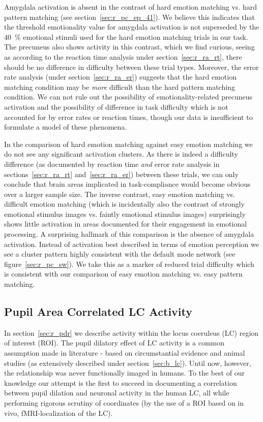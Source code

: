 	    Amygdala activation is absent in the contrast of hard emotion matching vs. hard pattern matching (see section~\ref{sec:r_pc_ep_41}).
	    We believe this indicates that the threshold emotionality value for amygdala activation is not superseded by the \SI{40}{\percent} emotional stimuli used for the hard emotion matching trials in our task.
	    The precuneus also shows activity in this contrast, which we find curious, seeing as according to the reaction time analysis under section~\ref{sec:r_ra_rt}, there should be no difference in difficulty between these trial types.
	    Moreover, the error rate analysis (under section~\ref{sec:r_ra_er}) suggests that the hard emotion matching condition may be \textit{more} difficult than the hard pattern matching condition.
	    We can not rule out the possibility of emotionality-related precuneus activation and the possibility of difference in task difficulty which is not accounted for by error rates or reaction times, though our data is insufficient to formulate a model of these phenomena.
	    
	    In the comparison of hard emotion matching against easy emotion matching we do not see any significant activation clusters.
	    As there is indeed a difficulty difference (as documented by reaction time \textit{and} error rate analysis in sections~\ref{sec:r_ra_rt} and~\ref{sec:r_ra_er}) between these trials, we can only conclude that brain areas implicated in task-compliance would become obvious over a larger sample size.
	    The inverse contrast, easy emotion matching vs. difficult emotion matching (which is incidentally also the contrast of strongly emotional stimulus images vs. faintly emotional stimulus images) surprisingly shows little activation in areas documented for their engagement in emotional processing.
	    A surprising hallmark of this comparison is the absence of amygdala activation.
	    Instead of activation best described in terms of emotion perception we see a cluster pattern highly consistent with the default mode network (see figure~\ref{sec:r_pc_sw}).
	    We take this as a marker of reduced trial difficulty which is consistent with our comparison of easy emotion matching vs. easy pattern matching. 
	\subsection{Pupil Area Correlated LC Activity}
	    In section~\ref{sec:r_pdr} we describe activity within the locus coeruleus (LC) region of interest (ROI).
	    The pupil dilatory effect of LC activity is a common assumption made in literature - based on circumstantial evidence and animal studies (as extensively described under section~\ref{sec:b_lc}).
	    Until now, however, the relationship was never functionally imaged in humans. 
	    To the best of our knowledge our attempt is the first to succeed in documenting a correlation between pupil dilation and neuronal activity in the human LC, all while performing rigorous scrutiny of coordinates (by the use of a ROI based on in vivo, fMRI-localization of the LC).
	     
